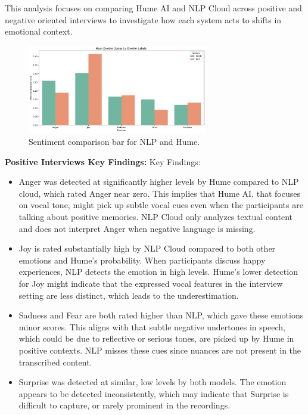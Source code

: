 This analysis focuses on comparing Hume AI and NLP Cloud across positive and negative oriented interviews to investigate how each system 
acts to shifts in emotional context. 

\begin{figure}[!h]
    \centering
    \includegraphics[width=0.7\textwidth]{png/results/rq2/sentiment_comparison_bar.pdf}
    \caption{Sentiment comparison bar for NLP and Hume.}
    \label{fig:sentiment-comp-rq2}
\end{figure}

\textbf{Positive Interviews Key Findings: }
Key Findings:
\begin{itemize}
    \item Anger was detected at significantly higher levels by Hume compared to NLP cloud, which rated Anger near zero. 
    This implies that Hume AI, that focuses on vocal tone, might pick up subtle vocal cues even when the participants are talking about positive memories. 
    NLP Cloud only analyzes textual content and does not interpret Anger when negative language is missing. 
    \item Joy is rated substantially high by NLP Cloud compared to both other emotions and Hume's probability. When participants discuss happy experiences, NLP 
    detects the emotion in high levels. Hume's lower detection for Joy might indicate that the expressed vocal features in the interview setting are less distinct,
    which leads to the underestimation. 
    \item Sadness and Fear are both rated higher than NLP, which gave these emotions minor scores. This aligns with that subtle negative undertones in speech, which could be due to reflective or 
    serious tones, are picked up by Hume in positive contexts. NLP misses these cues since nuances are not present in the transcribed content. 
    \item Surprise was detected at similar, low levels by both models. The emotion appears to be detected inconsistently, which may indicate that Surprise is difficult to capture, or rarely prominent in the recordings. 
\end{itemize}

